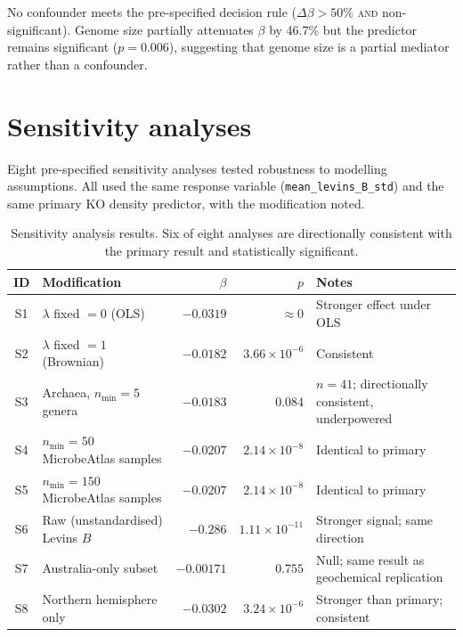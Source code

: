 \documentclass[11pt]{article}
\begin{document}
No confounder meets the pre-specified decision rule ($\Delta\beta > 50\%$
\textsc{and} non-significant).  Genome size partially attenuates $\beta$ by
46.7\% but the predictor remains significant ($p = 0.006$), suggesting that
genome size is a partial mediator rather than a confounder.

\section{Sensitivity analyses}
\label{sm:sensitivity}

Eight pre-specified sensitivity analyses tested robustness to modelling
assumptions.  All used the same response variable (\texttt{mean\_levins\_B\_std})
and the same primary KO density predictor, with the modification noted.

\begin{table}[H]
\centering
\caption{Sensitivity analysis results.  Six of eight analyses are
  directionally consistent with the primary result and statistically
  significant.}
\label{tab:sensitivity}
\small
\begin{tabular}{clrrl}
\toprule
ID & Modification & $\beta$ & $p$ & Notes \\
\midrule
S1 & $\lambda$ fixed $= 0$ (OLS) & $-0.0319$ & $\approx 0$ &
  Stronger effect under OLS \\
S2 & $\lambda$ fixed $= 1$ (Brownian) & $-0.0182$ & $3.66 \times 10^{-6}$ &
  Consistent \\
S3 & Archaea, $n_{\min} = 5$ genera & $-0.0183$ & $0.084$ &
  $n = 41$; directionally consistent, underpowered \\
S4 & $n_{\min} = 50$ MicrobeAtlas samples & $-0.0207$ & $2.14 \times 10^{-8}$ &
  Identical to primary \\
S5 & $n_{\min} = 150$ MicrobeAtlas samples & $-0.0207$ & $2.14 \times 10^{-8}$ &
  Identical to primary \\
S6 & Raw (unstandardised) Levins $B$ & $-0.286$ & $1.11 \times 10^{-11}$ &
  Stronger signal; same direction \\
S7 & Australia-only subset & $-0.00171$ & $0.755$ &
  Null; same result as geochemical replication \\
S8 & Northern hemisphere only & $-0.0302$ & $3.24 \times 10^{-6}$ &
  Stronger than primary; consistent \\
\bottomrule
\end{tabular}
\end{table}
\end{document}
